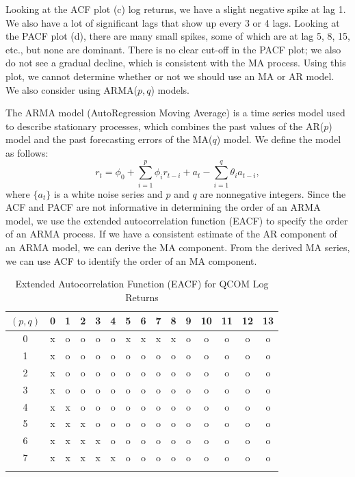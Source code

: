 Looking at the ACF plot (c) log returns, we have a slight negative spike at lag 1. We also have a lot of significant lags that show up every 3 or 4 lags. Looking at the PACF plot (d), there are many small spikes, some of which are at lag 5, 8, 15, etc., but none are dominant. There is no clear cut-off in the PACF plot; we also do not see a gradual decline, which is consistent with the MA process. Using this plot, we cannot determine whether or not we should use an MA or AR model. We also consider using ARMA($p,q$) models.

The ARMA model (AutoRegression Moving Average) is a time series model used to describe stationary processes, which combines the past values of the AR($p$) model and the past forecasting errors of the MA($q$) model. We define the model as follows:
\begin{equation}
	r_t=\phi_0+\sum_{i=1}^{p}\phi_ir_{t-i}+a_t-\sum_{i=1}^{q}\theta_ia_{t-i},
\end{equation}
where $\lbrace a_t\rbrace$ is a white noise series and $p$ and $q$ are nonnegative integers. Since the ACF and PACF are not informative in determining the order of an ARMA model, we use the extended autocorrelation function (EACF) to specify the order of an ARMA process. If we have a consistent estimate of the AR component of an ARMA model, we can derive the MA component. From the derived MA series, we can use ACF to identify the order of an MA component.
\begin{table}[H]
	\centering
	\caption{Extended Autocorrelation Function (EACF) for QCOM Log Returns}
	\begin{tabular}{c|cccccccccccccc}
		$(p, q)$ & 0 & 1 & 2 & 3 & 4 & 5 & 6 & 7 & 8 & 9 & 10 & 11 & 12 & 13 \\
		\hline
		0 & x & o & o & o & o & x & x & x & x & o & o & o & o & o \\
		1 & x & o & o & o & o & o & o & o & o & o & o & o & o & o \\
		2 & x & o & o & o & o & o & o & o & o & o & o & o & o & o \\
		3 & x & o & o & o & o & o & o & o & o & o & o & o & o & o \\
		4 & x & x & o & o & o & o & o & o & o & o & o & o & o & o \\
		5 & x & x & x & o & o & o & o & o & o & o & o & o & o & o \\
		6 & x & x & x & x & o & o & o & o & o & o & o & o & o & o \\
		7 & x & x & x & x & x & o & o & o & o & o & o & o & o & o \\
		\label{tab:eacf}
	\end{tabular}
\end{table}
